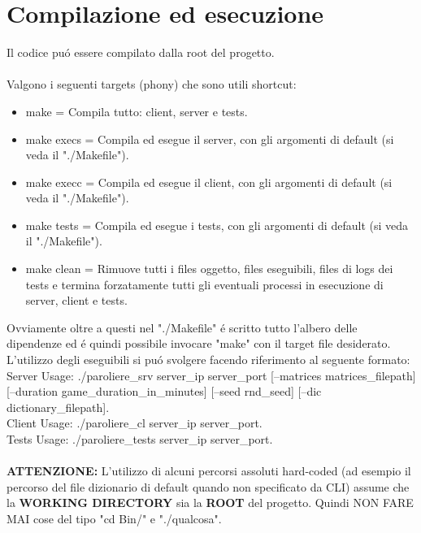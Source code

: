 \chapter{Compilazione ed esecuzione}

Il codice pu\'o essere compilato dalla root del progetto.
\\
\\
Valgono i seguenti targets (phony) che sono utili shortcut:

\begin{itemize}
\item make = Compila tutto: client, server e tests.
\item make execs = Compila ed esegue il server, con gli argomenti di default (si veda il "./Makefile").
\item make execc = Compila ed esegue il client, con gli argomenti di default (si veda il "./Makefile").
\item make tests = Compila ed esegue i tests, con gli argomenti di default (si veda il "./Makefile").
\item make clean = Rimuove tutti i files oggetto, files eseguibili, files di logs dei tests e termina forzatamente tutti gli eventuali processi in esecuzione di server, client e tests.
\end{itemize}
\leavevmode 
Ovviamente oltre a questi nel "./Makefile" \'e scritto tutto l'albero delle dipendenze ed \'e quindi possibile invocare "make" con il target file desiderato.
\\
L'utilizzo degli eseguibili si pu\'o svolgere facendo riferimento al seguente formato:
\\
Server Usage: ./paroliere\_srv server\_ip server\_port [--matrices matrices\_filepath] [--duration game\_duration\_in\_minutes] [--seed rnd\_seed] [--dic dictionary\_filepath].
\\
Client Usage: ./paroliere\_cl server\_ip server\_port.
\\
Tests Usage: ./paroliere\_tests server\_ip server\_port.
\\
\\
\textbf{ATTENZIONE:} L'utilizzo di alcuni percorsi assoluti hard-coded (ad esempio il percorso del file dizionario di default quando non specificato da CLI) assume che la \textbf{WORKING DIRECTORY} sia la \textbf{ROOT} del progetto. Quindi NON FARE MAI cose del tipo "cd Bin/" e "./qualcosa".